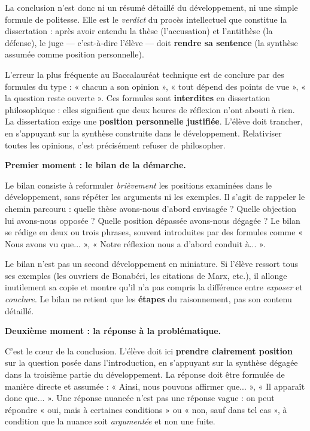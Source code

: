 \documentclass[11pt]{article}
\newcommand{\cle}[1]{{\popxbold\color{popdark}#1}}
\newcounter{popsec}
\newcounter{popsub}
\newcommand{\courssub}[1]{%
  \stepcounter{popsub}%
  \par\vspace{9pt}\noindent{\popxbold\fontsize{11.5}{13}\selectfont\color{popink}{\color{poporange}\thepopsec.\thepopsub}\hspace{6pt}#1}\par\nopagebreak\vspace{4pt}
}
\begin{document}
La conclusion n'est donc ni un résumé détaillé du développement, ni une simple formule de politesse. Elle est le \emph{verdict} du procès intellectuel que constitue la dissertation : après avoir entendu la thèse (l'accusation) et l'antithèse (la défense), le juge — c'est-à-dire l'élève — doit \textbf{rendre sa sentence} (la synthèse assumée comme position personnelle).

\begin{attention}
L'erreur la plus fréquente au Baccalauréat technique est de conclure par des formules du type : « chacun a son opinion », « tout dépend des points de vue », « la question reste ouverte ». Ces formules sont \textbf{interdites} en dissertation philosophique : elles signifient que deux heures de réflexion n'ont abouti à rien. La dissertation exige une \textbf{position personnelle justifiée}. L'élève doit trancher, en s'appuyant sur la synthèse construite dans le développement. Relativiser toutes les opinions, c'est précisément refuser de philosopher.
\end{attention}

\courssub{Les trois moments de la conclusion}

\textbf{Premier moment : le bilan de la démarche.}\par
Le \cle{bilan} consiste à reformuler \emph{brièvement} les positions examinées dans le développement, sans répéter les arguments ni les exemples. Il s'agit de rappeler le chemin parcouru : quelle thèse avons-nous d'abord envisagée ? Quelle objection lui avons-nous opposée ? Quelle position dépassée avons-nous dégagée ? Le bilan se rédige en deux ou trois phrases, souvent introduites par des formules comme « Nous avons vu que... », « Notre réflexion nous a d'abord conduit à... ».

\begin{attention}
Le bilan n'est pas un second développement en miniature. Si l'élève ressort tous ses exemples (les ouvriers de Bonabéri, les citations de Marx, etc.), il allonge inutilement sa copie et montre qu'il n'a pas compris la différence entre \emph{exposer} et \emph{conclure}. Le bilan ne retient que les \textbf{étapes} du raisonnement, pas son contenu détaillé.
\end{attention}

\textbf{Deuxième moment : la réponse à la problématique.}\par
C'est le cœur de la conclusion. L'élève doit ici \textbf{prendre clairement position} sur la question posée dans l'introduction, en s'appuyant sur la synthèse dégagée dans la troisième partie du développement. La réponse doit être formulée de manière directe et assumée : « Ainsi, nous pouvons affirmer que... », « Il apparaît donc que... ». Une réponse nuancée n'est pas une réponse vague : on peut répondre « oui, mais à certaines conditions » ou « non, sauf dans tel cas », à condition que la nuance soit \emph{argumentée} et non une fuite.
\end{document}
